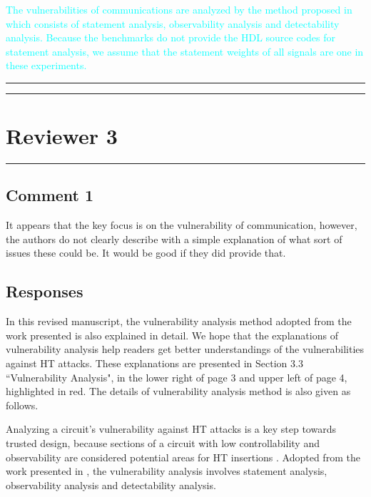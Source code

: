 \documentclass[10pt,journal, compsoc]{IEEEtran}
\begin{document}
\textcolor{cyan}{The vulnerabilities of communications are analyzed by the method proposed in \cite{conference:HS} which consists of statement analysis, observability analysis and detectability analysis. Because the benchmarks do not provide the HDL source codes for statement analysis, we assume that the statement weights of all signals are one in these experiments.}

\noindent\rule[0.25\baselineskip]{252pt}{1pt}

\noindent\rule[0.25\baselineskip]{252pt}{1pt}





\vspace*{3em}


\section*{{\Large Reviewer 3}}

\noindent\rule[0.25\baselineskip]{252pt}{1pt}

\subsection*{Comment 1}
It appears that the key focus is on the vulnerability of communication, however, the authors do not clearly describe with a simple explanation of what sort of issues these could be. It would be good if they did provide that.

\subsection*{Responses}

In this revised manuscript, the vulnerability analysis method adopted from the work presented \cite{conference:HS} is also explained in detail. We hope that the explanations of vulnerability analysis help readers get better understandings of the vulnerabilities against HT attacks. These explanations are presented in Section 3.3 ``Vulnerability Analysis", in the lower right of page 3 and upper left of page 4, highlighted in red. The details of vulnerability analysis method is also given as follows.

\color{red}

Analyzing a circuit's vulnerability against HT attacks is a key step towards trusted design, because sections of a circuit with low controllability and observability are considered potential areas for HT insertions \cite{article:JC,article:YD}. Adopted from the work presented in \cite{conference:HS}, the vulnerability analysis involves statement analysis, observability analysis and detectability analysis.
\end{document}
